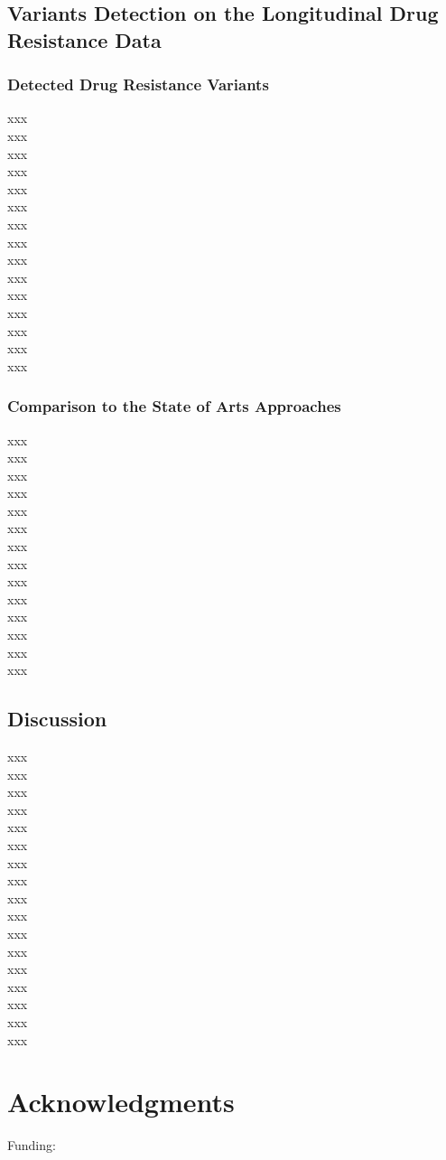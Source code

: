 \documentclass{article}
\begin{document}
\subsection{Variants Detection on the Longitudinal Drug Resistance Data}
\subsubsection{Detected Drug Resistance Variants}
xxx\\
xxx\\
xxx\\
xxx\\
xxx\\
xxx\\
xxx\\
xxx\\
xxx\\
xxx\\
xxx\\
xxx\\
xxx\\
xxx\\
xxx\\

\subsubsection{Comparison to the State of Arts Approaches}
xxx\\
xxx\\
xxx\\
xxx\\
xxx\\
xxx\\
xxx\\
xxx\\
xxx\\
xxx\\
xxx\\
xxx\\
xxx\\
xxx\\

\subsection{Discussion}
xxx\\
xxx\\
xxx\\
xxx\\
xxx\\
xxx\\
xxx\\
xxx\\
xxx\\
xxx\\
xxx\\
xxx\\
xxx\\
xxx\\
xxx\\
xxx\\
xxx\\

\section*{Acknowledgments}
Funding:


\appendix



\end{document}

